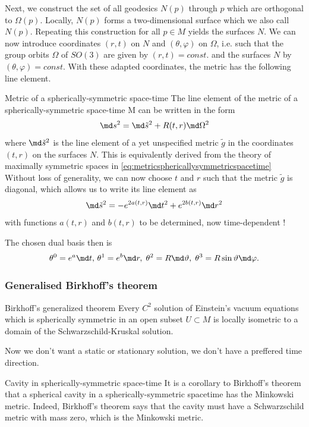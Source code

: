 	Next, we construct the set of all geodesics $N(p)$ through $p$ which are
	orthogonal to $Ω(p)$. Locally, $N(p)$ forms a two-dimensional surface
	which we also call $N(p)$. Repeating this construction for all $p \in M$
	yields the surfaces $N$.
	We can now introduce coordinates $(r, t)$ on $N$ and $(θ, φ)$ on $Ω$, i.e. such
	that the group orbits $Ω$ of $SO(3)$ are given by $(r, t) = const.$ and the
	surfaces $N$ by $(θ, φ) = const.$ With these adapted coordinates, the metric has the following line element.
	\begin{mybox}{Metric of a spherically-symmetric space-time}
		The line element of the metric of a spherically-symmetric space-time
		M can be written in the form
		\begin{equation}
			\md s^2 = \md \tilde{s}^2 + R(t,r) \md \Omega^2
		\end{equation}
		where $\md \tilde{s}^2$ is the line element of a yet unspecified metric $\tilde{g}$ in the
		coordinates $(t, r)$ on the surfaces $N$. This is equivalently derived from the theory of maximally symmetric spaces in \ref{eq:metricsphericallysymmetricspacetime}
		Without loss of generality, we can now choose $t$ and $r$ such that the
		metric $\tilde{g}$ is diagonal, which allows us to write its line element as
		\begin{equation}
			\md \tilde{s}^2 = -e^{2a(t,r)} \md t^2 +e^{2 b(t,r)} \md r^2
		\end{equation}
		with functions $a(t, r)$ and $b(t, r)$ to be determined, now time-dependent !
	\end{mybox}
The chosen dual basis then is
\begin{equation}
	\theta^0 = e^a \md t, \, \theta^1 =e^b \md r, \; \theta^2 = R \md \vartheta, \; \theta^3 = R \sin \vartheta \md \varphi.
\end{equation}
	
	
	\subsubsection{Generalised Birkhoff's theorem}
	\begin{mybox}{Birkhoff's generalized theorem}
		Every $C^2$ solution of Einstein’s vacuum equations which is spherically
		symmetric in an open subset $U \subset M$ is locally isometric to a domain
		of the Schwarzschild-Kruskal solution.
	\end{mybox}
Now we don't want a static or stationary solution, we don't have a preffered time direction. 
	\begin{mybox}{Cavity in spherically-symmetric space-time}
		It is a corollary to Birkhoff’s theorem that a spherical cavity in a
		spherically-symmetric spacetime has the Minkowski metric. Indeed,
		Birkhoff’s theorem says that the cavity must have a Schwarzschild
		metric with mass zero, which is the Minkowski metric.
	\end{mybox}
	
